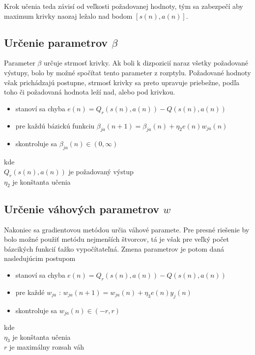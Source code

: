 Krok učenia teda závisí od veľkosti požadovanej hodnoty, tým sa zabezpečí aby maximum
krivky naozaj ležalo nad bodom $[s(n),a(n)]$.

\subsection{Určenie parametrov $\beta$}

Parameter $\beta$ určuje strmosť krivky. Ak boli k dizpozicií naraz všetky
požadované výstupy, bolo by možné spočítat tento parameter z rozptylu.
Požadované hodnoty však prichádzajú postupne, strmosť krivky sa preto upravuje priebežne,
podľa toho či požadovaná hodnota leží nad, alebo pod krivkou.

\begin{itemize}
\item stanoví sa chyba $e(n) = Q_r(s(n), a(n)) - Q(s(n), a(n))$
\item pre každú bázickú funkciu  $\beta_{ja}(n+1)= \beta_{ja}(n) + \eta_2 e(n)w_{ja}(n)$
\item skontroluje sa $\beta_{ja}(n) \in (0, \infty)$
\end{itemize}

kde \\
$Q_r(s(n), a(n))$ je požadovaný výstup \\
$\eta_2$ je konštanta učenia \\


\subsection{Určenie váhových parametrov $w$}

Nakoniec sa gradientovou metódou určia váhové paramete. Pre presné
riešenie by bolo možné použiť metódu nejmenších štvorcov, tá je však pre veľký počet
bázcikých funkcií ťažko vypočítateľná. Zmena parametrov je potom daná nasledujúcim postupom

\begin{itemize}
\item stanoví sa chyba $e(n) = Q_r(s(n), a(n)) - Q(s(n), a(n))$
\item pre každé $w_{ja}$ : $w_{ja}(n+1)= w_{ja}(n) + \eta_3 e(n)y_j(n)$
\item skontroluje sa $w_{ja}(n) \in (-r, r)$
\end{itemize}

kde \\
$\eta_3$ je konštanta učenia \\
$r$ je maximálny rozsah váh \\

